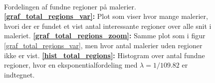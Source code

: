 {\begin{figure}[!h]
    \centering
    \\
    \caption[]{Fordelingen af fundne regioner på malerier.
    \textbf{\ref{graf_total_regions_var}:} Plot som viser hvor mange
    malerier, hvori der er fundet et vist antal interessante regioner
    over alle snit i maleriet.  \textbf{\ref{graf_total_regions_zoom}:}
    Samme plot som i figur \ref{graf_total_regions_var}, men hvor antal
    malerier uden regioner ikke er vist.
    \textbf{\ref{hist_total_regions}:} Histogram over antal fundne
    regioner, hvor en eksponentialfordeling med $\lambda = 1/109.82$ er
    indtegnet.}
    \label{total_regions_plots}
\end{figure}

}
